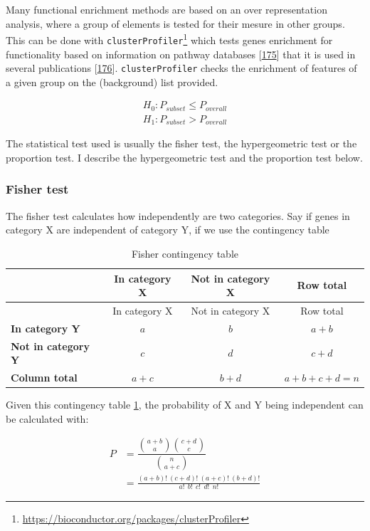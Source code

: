 \documentclass[
  12pt,
  a4paper,
  twoside,
  openright]{book}
\DeclareRobustCommand{\href}[2]{#2\footnote{\url{#1}}}
\begin{document}
Many functional enrichment methods are based on an over representation analysis, where a group of elements is tested for their mesure in other groups.
This can be done with \href{https://bioconductor.org/packages/clusterProfiler}{\texttt{clusterProfiler}} which tests genes enrichment for functionality based on information on pathway databases {[}\protect\hyperlink{ref-wu2021}{175}{]} that it is used in several publications {[}\protect\hyperlink{ref-richter2021}{176}{]}.
\texttt{clusterProfiler} checks the enrichment of features of a given group on the (background) list provided.

\[
\begin{aligned}
H_0 : P_{subset} \leq  P_{overall} \\
H_1 : P_{subset} > P_{overall}
\end{aligned}
\]

The statistical test used is usually the fisher test, the hypergeometric test or the proportion test.
I describe the hypergeometric test and the proportion test below.

\hypertarget{fisher-test}{%
\subsubsection{Fisher test}\label{fisher-test}}

The fisher test calculates how independently are two categories.
Say if genes in category X are independent of category Y, if we use the contingency table

\begin{longtable}[]{@{}lccc@{}}
\caption{\label{tab:fisher} Fisher contingency table}\tabularnewline
\toprule
& In category X & Not in category X & Row total \\
\midrule
\endfirsthead
\toprule
& In category X & Not in category X & Row total \\
\midrule
\endhead
\textbf{In category Y} & \(a\) & \(b\) & \(a+b\) \\
\textbf{Not in category Y} & \(c\) & \(d\) & \(c+d\) \\
\textbf{Column total} & \(a+c\) & \(b+d\) & \(a+b+c+d = n\) \\
\bottomrule
\end{longtable}

Given this contingency table \ref{tab:fisher}, the probability of X and Y being independent can be calculated with:

\[
\begin{aligned}
P & = \dfrac{ \binom{a+b}{a} \binom{c+d}{c} }{\binom{n}{a+c}} \\
& = \frac{(a+b)!~(c+d)!~(a+c)!~(b+d)!}{a!~~b!~~c!~~d!~~n!}
\end{aligned}
\]
\end{document}
